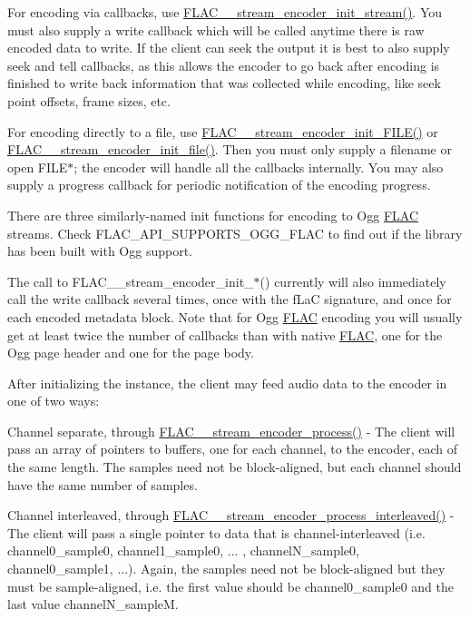 For encoding via callbacks, use \hyperlink{group__flac__stream__encoder_ga85221c4ceb9f22dfd4983d8f07a9a35b}{F\+L\+A\+C\+\_\+\+\_\+stream\+\_\+encoder\+\_\+init\+\_\+stream()}. You must also supply a write callback which will be called anytime there is raw encoded data to write. If the client can seek the output it is best to also supply seek and tell callbacks, as this allows the encoder to go back after encoding is finished to write back information that was collected while encoding, like seek point offsets, frame sizes, etc.

For encoding directly to a file, use \hyperlink{group__flac__stream__encoder_ga78653fea5d9bc490fff34e3ef86de944}{F\+L\+A\+C\+\_\+\+\_\+stream\+\_\+encoder\+\_\+init\+\_\+\+F\+I\+L\+E()} or \hyperlink{group__flac__stream__encoder_ga693bb5ed30d912822e0e6c7c0404428c}{F\+L\+A\+C\+\_\+\+\_\+stream\+\_\+encoder\+\_\+init\+\_\+file()}. Then you must only supply a filename or open {\ttfamily F\+I\+L\+E$\ast$}; the encoder will handle all the callbacks internally. You may also supply a progress callback for periodic notification of the encoding progress.

There are three similarly-\/named init functions for encoding to Ogg \hyperlink{namespace_f_l_a_c}{F\+L\+AC} streams. Check {\ttfamily F\+L\+A\+C\+\_\+\+A\+P\+I\+\_\+\+S\+U\+P\+P\+O\+R\+T\+S\+\_\+\+O\+G\+G\+\_\+\+F\+L\+AC} to find out if the library has been built with Ogg support.

The call to F\+L\+A\+C\+\_\+\+\_\+stream\+\_\+encoder\+\_\+init\+\_\+$\ast$() currently will also immediately call the write callback several times, once with the {\ttfamily f\+LaC} signature, and once for each encoded metadata block. Note that for Ogg \hyperlink{namespace_f_l_a_c}{F\+L\+AC} encoding you will usually get at least twice the number of callbacks than with native \hyperlink{namespace_f_l_a_c}{F\+L\+AC}, one for the Ogg page header and one for the page body.

After initializing the instance, the client may feed audio data to the encoder in one of two ways\+:


\begin{DoxyItemize}
\item Channel separate, through \hyperlink{group__flac__stream__encoder_gae187ec4f6cab3ca109637996ee23272d}{F\+L\+A\+C\+\_\+\+\_\+stream\+\_\+encoder\+\_\+process()} -\/ The client will pass an array of pointers to buffers, one for each channel, to the encoder, each of the same length. The samples need not be block-\/aligned, but each channel should have the same number of samples.
\item Channel interleaved, through \hyperlink{group__flac__stream__encoder_ga67c2ff5b23b945180797de420b1f27c0}{F\+L\+A\+C\+\_\+\+\_\+stream\+\_\+encoder\+\_\+process\+\_\+interleaved()} -\/ The client will pass a single pointer to data that is channel-\/interleaved (i.\+e. channel0\+\_\+sample0, channel1\+\_\+sample0, ... , channel\+N\+\_\+sample0, channel0\+\_\+sample1, ...). Again, the samples need not be block-\/aligned but they must be sample-\/aligned, i.\+e. the first value should be channel0\+\_\+sample0 and the last value channel\+N\+\_\+sampleM.
\end{DoxyItemize}

